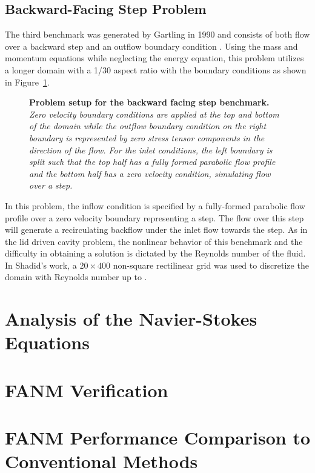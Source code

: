 \subsection{Backward-Facing Step Problem}
\label{subsec:backward_facing_step}
The third benchmark was generated by Gartling in 1990 and consists of
both flow over a backward step and an outflow boundary condition
\citep{gartling_test_1990}. Using the mass and momentum equations
while neglecting the energy equation, this problem utilizes a longer
domain with a 1/30 aspect ratio with the boundary conditions as shown
in Figure~\ref{fig:backward_facing_step}.
\begin{figure}[t!]
  \begin{center}
    \scalebox{1.3}{
       }
  \end{center}
  \caption{\textbf{Problem setup for the backward facing step
      benchmark.} \textit{Zero velocity boundary conditions are
      applied at the top and bottom of the domain while the outflow
      boundary condition on the right boundary is represented by zero
      stress tensor components in the direction of the flow. For the
      inlet conditions, the left boundary is split such that the top
      half has a fully formed parabolic flow profile and the bottom
      half has a zero velocity condition, simulating flow over a
      step.}}
  \label{fig:backward_facing_step}
\end{figure}
In this problem, the inflow condition is specified by a fully-formed
parabolic flow profile over a zero velocity boundary representing a
step. The flow over this step will generate a recirculating backflow
under the inlet flow towards the step. As in the lid driven cavity
problem, the nonlinear behavior of this benchmark and the difficulty
in obtaining a solution is dictated by the Reynolds number of the
fluid. In Shadid's work, a $20 \times 400$ non-square rectilinear grid
was used to discretize the domain with Reynolds number up to
.

\section{Analysis of the Navier-Stokes Equations}
\label{sec:ns_analysis}

\section{FANM Verification}
\label{sec:fanm_verification}

\section{FANM Performance Comparison to Conventional Methods}
\label{sec:fanm_comparison}

